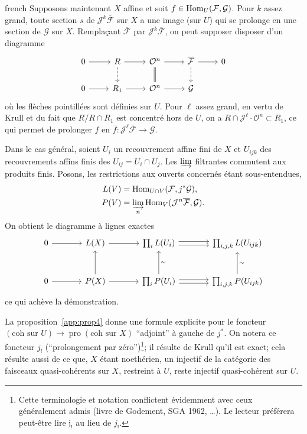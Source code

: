 \begin{hyphenrules}{french}
Supposons maintenant $X$ affine et soit $f \in \operatorname{Hom}_U(\mathcal{F},\mathcal{G})$. Pour $k$ assez grand, toute section $s$ de $\mathcal{J}^{k}\overline{\mathcal{F}}$ sur $X$ a une image (sur $U$) qui se prolonge en une section de $\mathcal{G}$ sur $X$. Rempla\c{c}ant $\overline{\mathcal{F}}$ par $\mathcal{J}^{k}\overline{\mathcal{F}}$, on peut supposer disposer d'un diagramme
\[
\begin{tikzcd}
0 \ar[r] & R \ar[r] \ar[d,dashed] & \mathcal{O}^{n} \ar[r] \ar[d,equals] & \overline{\mathcal F} \ar[r] \ar[d,dashed] & 0 \\
0 \ar[r] & R_1 \ar[r] & \mathcal{O}^{n} \ar[r] & \mathcal G
\end{tikzcd}
\]
o\`u les fl\`eches pointill\'ees sont d\'efinies sur $U$. Pour $\ell$ assez grand, en vertu de Krull et du fait que $R/R \cap R_1$ est concentr\'e hors de $U$, on a $R \cap \mathcal{J}^{\ell} \cdot \mathcal{O}^{n} \subset R_1$, ce qui permet de prolonger $f$ en $\overline{f}: \mathcal{J}^{\ell}\overline{\mathcal{F}} \to \mathcal{G}$.

Dans le cas g\'en\'eral, soient $U_i$ un recouvrement affine fini de $X$ et $U_{ijk}$ des recouvrements affins finis des $U_{ij} = U_i \cap U_j$. Les $\varinjlim$ filtrantes commutent aux produits finis. Posons, les restrictions aux ouverts concern\'es \'etant sous-entendues,
\[
\begin{aligned}
L(V)&=\operatorname{Hom}_{U\cap V}(\mathcal F,j^*\mathcal G),\\
P(V)&=\varinjlim_n\operatorname{Hom}_V(\mathcal J^n\overline{\mathcal F},\mathcal G).
\end{aligned}
\]
On obtient le diagramme \`a lignes exactes
\[
\begin{tikzcd}[column sep=large,row sep=large]
0 \ar[r] & L(X) \ar[r]
 & \prod_i L(U_i) \ar[r,shift left=.5ex] \ar[r,shift right=.5ex]
 & \prod_{i,j,k}L(U_{ijk}) \\
0 \ar[r] & P(X) \ar[r] \ar[u]
 & \prod_i P(U_i) \ar[r,shift left=.5ex] \ar[r,shift right=.5ex] \ar[u,"\sim"']
 & \prod_{i,j,k}P(U_{ijk}) \ar[u,"\sim"']
\end{tikzcd}
\]
ce qui ach\`eve la d\'emonstration.

La proposition~\ref{app:prop4} donne une formule explicite pour le foncteur
$(\text{coh sur }U)\to\operatorname{pro}(\text{coh sur }X)$
``adjoint'' \`a gauche de $j^*$. On notera ce foncteur $j_!$
(``prolongement par z\'ero'')\footnote{Cette terminologie et notation conflictent \'evidemment avec ceux g\'en\'eralement admis (livre de Godement, SGA 1962, \dots). Le lecteur pr\'ef\'erera peut-\^etre lire $\mathfrak{j}_!$ au lieu de $j_!$.};
il r\'esulte de Krull qu'il est exact; cela r\'esulte aussi de ce que,
$X$ \'etant noeth\'erien, un injectif de la cat\'egorie des faisceaux
quasi-coh\'erents sur $X$, restreint \`a $U$, reste injectif quasi-coh\'erent sur $U$.


\end{hyphenrules}
